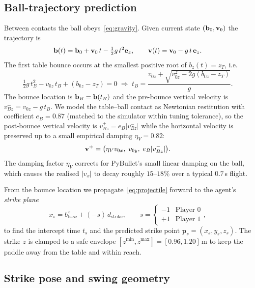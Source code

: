 \subsection{Ball-trajectory prediction}
\label{sub:predict}

Between contacts the ball obeys~\eqref{eq:gravity}. Given current state
$(\mathbf{b}_{0},\mathbf{v}_{0})$ the trajectory is
\begin{equation}
  \mathbf{b}(t)=\mathbf{b}_{0}+\mathbf{v}_{0}\,t-\tfrac{1}{2}g\,t^{2}\mathbf{e}_{z},\qquad
  \mathbf{v}(t)=\mathbf{v}_{0}-g\,t\,\mathbf{e}_{z}.
  \label{eq:projectile}
\end{equation}
The first table bounce occurs at the smallest positive root of
$b_{z}(t)=z_{T}$, i.e.
\begin{equation}
  \tfrac{1}{2}g\,t_{B}^{2}-v_{0z}\,t_{B}+(b_{0z}-z_{T})=0
  \;\Rightarrow\;
  t_{B}=\frac{v_{0z}+\sqrt{v_{0z}^{2}-2g(b_{0z}-z_{T})}}{g}.
  \label{eq:bounce}
\end{equation}
The bounce location is
$\mathbf{b}_{B}=\mathbf{b}(t_{B})$ and the pre-bounce vertical
velocity is $v_{Bz}^{-}=v_{0z}-g\,t_{B}$. We model the
table--ball contact as Newtonian restitution with coefficient
$e_{B}=0.87$ (matched to the simulator within tuning tolerance), so the
post-bounce vertical velocity is $v_{Bz}^{+}=e_{B}|v_{Bz}^{-}|$ while the
horizontal velocity is preserved up to a small empirical damping
$\eta_{V}=0.82$:
\begin{equation}
  \mathbf{v}^{+}=\bigl(\eta_{V}v_{0x},\;v_{0y},\;e_{B}|v_{Bz}^{-}|\bigr).
  \label{eq:postbounce}
\end{equation}
The damping factor $\eta_{V}$ corrects for PyBullet's small linear
damping on the ball, which causes the realised $|v_{x}|$ to decay
roughly $15$--$18\%$ over a typical $0.7$\,s flight.

From the bounce location we propagate~\eqref{eq:projectile} forward to
the agent's \emph{strike plane}
\[
  x_{s}=b_{\mathrm{base}}^{x}+(-s)\,d_{\mathrm{strike}},
  \qquad s=\begin{cases}-1 & \text{Player 0}\\+1 & \text{Player 1}\end{cases},
\]
to find the intercept time $t_{s}$ and the predicted strike point
$\mathbf{p}_{s}=(x_{s},y_{s},z_{s})$. The strike $z$ is clamped to a
safe envelope $[z^{\min},z^{\max}]=[0.96,1.20]$\,m to keep the paddle
away from the table and within reach.

\subsection{Strike pose and swing geometry}
\label{sub:plan}

